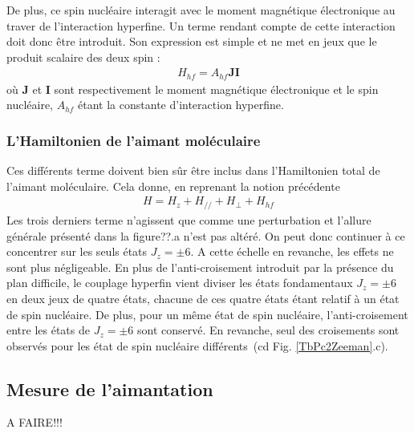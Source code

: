 De plus, ce spin nucléaire interagit avec le moment magnétique électronique au traver de l'interaction hyperfine. Un terme rendant compte de cette interaction doit donc \^etre introduit. Son expression est simple et ne met en jeux que le produit scalaire des deux spin :
\begin{eqnarray}
H_{hf} = A_{hf}\mathbf{J}\mathbf{I}
\end{eqnarray}
où $\mathbf{J}$ et $\mathbf{I}$ sont respectivement le moment magnétique électronique et le spin nucléaire, $A_{hf}$ étant la constante d'interaction hyperfine.

\subsubsection{L'Hamiltonien de l'aimant moléculaire}

Ces différents terme doivent bien s\^ur \^etre inclus dans l'Hamiltonien total de l'aimant moléculaire. Cela donne, en reprenant la notion précédente
\begin{eqnarray}
H = H_z + H_{//} + H_{\perp} + H_{hf}
\end{eqnarray}
Les trois derniers terme n'agissent que comme une perturbation et l'allure générale présenté dans la figure??.a n'est pas altéré. On peut donc continuer à ce concentrer sur les seuls états $J_z = \pm 6$. A cette échelle en revanche, les effets ne sont plus négligeable. En plus de l'anti-croisement introduit par la présence du plan difficile, le couplage hyperfin vient diviser les états fondamentaux  $J_z = \pm 6$ en deux jeux de quatre états, chacune de ces quatre états étant relatif à un état de spin nucléaire. De plus, pour un m\^eme état de spin nucléaire, l'anti-croisement entre les états de  $J_z = \pm 6$ sont conservé. En revanche, seul des croisements sont observés pour les état de spin nucléaire différents~(cd Fig. \ref{TbPc2Zeeman}.c).

\subsection{Mesure de l'aimantation}

A FAIRE!!!